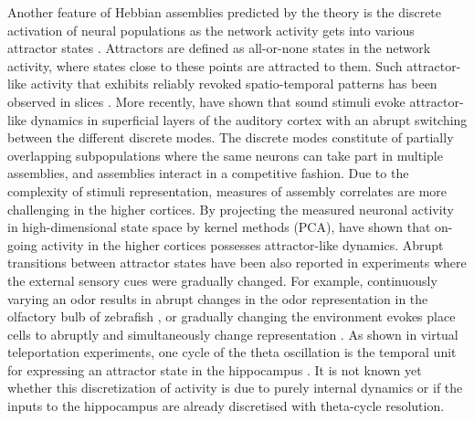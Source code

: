     Another feature of Hebbian assemblies predicted by the theory is the
    discrete activation of neural populations as the network activity gets into
    various attractor states \citep{Hopfield1982}. Attractors are defined as
    all-or-none states in the network activity, where states close to these
    points are attracted to them. Such attractor-like activity that exhibits
    reliably revoked spatio-temporal patterns has been observed in slices
    \cite[e.g.,][]{Cossart2003, MacLean2005}. More recently,
    \cite{Bathellier2012} have shown that sound stimuli evoke
    attractor-like dynamics in superficial layers of the auditory cortex with
    an abrupt switching between the different discrete modes. The discrete
    modes constitute of partially overlapping subpopulations where the same
    neurons can take part in multiple assemblies, and assemblies interact in a
    competitive fashion. Due to the complexity of stimuli representation,
    measures of assembly correlates are more challenging in the higher cortices. By projecting the
    measured neuronal activity in high-dimensional state space by kernel
    methods (PCA), \cite{Balaguer2011} have shown that on-going activity in the
    higher cortices possesses attractor-like dynamics. Abrupt transitions between
    attractor states have been also reported in experiments where the external
    sensory cues were gradually changed. For example, continuously varying an
    odor results in abrupt changes in the odor representation in the olfactory
    bulb of zebrafish \citep{Niessing2010}, or gradually changing the
    environment evokes place cells to abruptly and simultaneously change
    representation \citep{Wills2005}. As shown in virtual teleportation
    experiments, one cycle of the theta oscillation is the temporal unit for
    expressing an attractor state in the hippocampus \citep{Jezek2011}. It is
    not known yet whether this discretization of activity is due to purely
    internal dynamics or if the inputs to the hippocampus are already discretised
    with theta-cycle resolution. 



